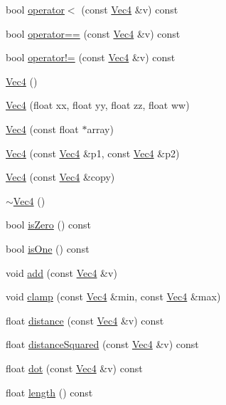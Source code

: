\begin{DoxyCompactItemize}
\item 
bool \hyperlink{classVec4_ac7ecf33888559cc10db167b2b64282e2}{operator$<$} (const \hyperlink{classVec4}{Vec4} \&v) const
\item 
bool \hyperlink{classVec4_aee56eb96539827efc62ff4d9fde66c67}{operator==} (const \hyperlink{classVec4}{Vec4} \&v) const
\item 
bool \hyperlink{classVec4_a3b6232cb8bef92bc2137590dace24c61}{operator!=} (const \hyperlink{classVec4}{Vec4} \&v) const
\item 
\hyperlink{classVec4_a55a46de1fc067fd2d696ea5be485ce3c}{Vec4} ()
\item 
\hyperlink{classVec4_a96da810dd4ac8de9dd0ede2d29528ee4}{Vec4} (float xx, float yy, float zz, float ww)
\item 
\hyperlink{classVec4_ac7a50dd21f1ba9b59ebaab777e41918f}{Vec4} (const float $\ast$array)
\item 
\hyperlink{classVec4_a91984373f7c3e83afcadf30ec5dad52a}{Vec4} (const \hyperlink{classVec4}{Vec4} \&p1, const \hyperlink{classVec4}{Vec4} \&p2)
\item 
\hyperlink{classVec4_acf7b803835459315b73f0cab3b5d392c}{Vec4} (const \hyperlink{classVec4}{Vec4} \&copy)
\item 
\hyperlink{classVec4_a3c8428ad7cfa4fe9e82ea571ab0ad119}{$\sim$\+Vec4} ()
\item 
bool \hyperlink{classVec4_a4736299b9772b67d32f3ca2ef45f39ad}{is\+Zero} () const
\item 
bool \hyperlink{classVec4_aed369ed7241495fa5bf5e7e21a327705}{is\+One} () const
\item 
void \hyperlink{classVec4_a70178c94654489167656a8fe9452f14b}{add} (const \hyperlink{classVec4}{Vec4} \&v)
\item 
void \hyperlink{classVec4_a6f571d3b456dde4cd2bb6fbaf280e6de}{clamp} (const \hyperlink{classVec4}{Vec4} \&min, const \hyperlink{classVec4}{Vec4} \&max)
\item 
float \hyperlink{classVec4_a067897a2fd0c8b42e73a07e461d83099}{distance} (const \hyperlink{classVec4}{Vec4} \&v) const
\item 
float \hyperlink{classVec4_ad8b026a5e96599e253ab0d844fcddb72}{distance\+Squared} (const \hyperlink{classVec4}{Vec4} \&v) const
\item 
float \hyperlink{classVec4_ab23760fc52f652e9382d98f1e50e8a1b}{dot} (const \hyperlink{classVec4}{Vec4} \&v) const
\item 
float \hyperlink{classVec4_ac42249851a68eaf15815285b76763058}{length} () const
\item 

\end{DoxyCompactItemize}
